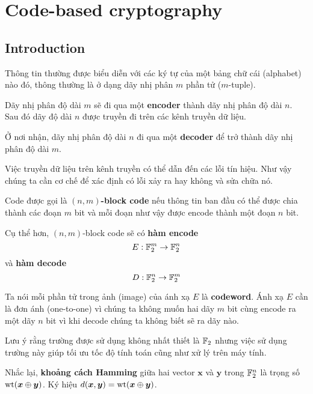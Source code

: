\chapter{Code-based cryptography}

\section{Introduction}

Thông tin thường được biểu diễn với các ký tự của một bảng chữ cái (alphabet) nào đó, thông thường là ở dạng dãy nhị phân $m$ phần tử ($m$-tuple).

Dãy nhị phân độ dài $m$ sẽ đi qua một \textbf{encoder} thành dãy nhị phân độ dài $n$. Sau đó dãy độ dài $n$ được truyền đi trên các kênh truyền dữ liệu.

Ở nơi nhận, dãy nhị phân độ dài $n$ đi qua một \textbf{decoder} để trở thành dãy nhị phân độ dài $m$.

Việc truyền dữ liệu trên kênh truyền có thể dẫn đến các lỗi tín hiệu. Như vậy chúng ta cần cơ chế để xác định có lỗi xảy ra hay không và sửa chữa nó.

\begin{definition}
    Code được gọi là \textbf{$(n, m)$-block code} nếu thông tin ban đầu có thể được chia thành các đoạn $m$ bit và mỗi đoạn như vậy được encode thành một đoạn $n$ bit. 
\end{definition}

Cụ thể hơn, $(n, m)$-block code sẽ có \textbf{hàm encode}
\begin{equation*}
    E: \mathbb{F}_2^m \to \mathbb{F}_2^n
\end{equation*}
và \textbf{hàm decode}
\begin{equation*}
    D: \mathbb{F}_2^n \to \mathbb{F}_2^m
\end{equation*}

Ta nói mỗi phần tử trong ảnh (image) của ánh xạ $E$ là \textbf{codeword}. Ánh xạ $E$ cần là đơn ánh (one-to-one) vì chúng ta không muốn hai dãy $m$ bit cùng encode ra một dãy $n$ bit vì khi decode chúng ta không biết sẽ ra dãy nào.

Lưu ý rằng trường được sử dụng không nhất thiết là $\mathbb{F}_2$ nhưng việc sử dụng trường này giúp tối ưu tốc độ tính toán cũng như xử lý trên máy tính.

Nhắc lại, \textbf{khoảng cách Hamming} giữa hai vector $\bm{x}$ và $\bm{y}$ trong $\mathbb{F}_2^n$ là trọng số $\operatorname{wt}(\bm{x} \oplus \bm{y})$. Ký hiệu $d(\bm{x}, \bm{y}) = \operatorname{wt}(\bm{x} \oplus \bm{y})$.


